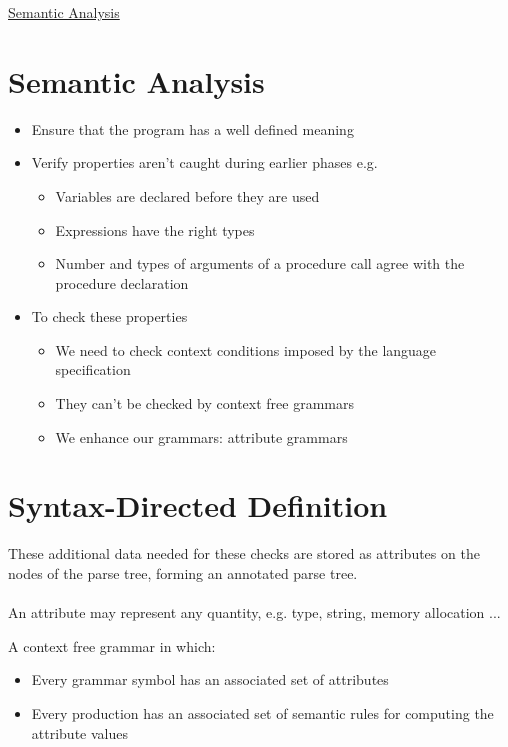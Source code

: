 \documentclass{article}[18pt]
\begin{document}
\begin{center}
\underline{\huge Semantic Analysis}
\end{center}
\section{Semantic Analysis}
\begin{itemize}
	\item Ensure that the program has a well defined meaning
	\item Verify properties aren't caught during earlier phases e.g.
	\begin{itemize}
		\item Variables are declared before they are used
		\item Expressions have the right types
		\item Number and types of arguments of a procedure call agree with the procedure declaration
	\end{itemize}
	\item To check these properties
	\begin{itemize}
		\item We need to check context conditions imposed by the language specification
		\item They can't be checked by context free grammars
		\item We enhance our grammars: attribute grammars
	\end{itemize}
\end{itemize}
\section{Syntax-Directed Definition}
These additional data needed for these checks are stored as attributes on the nodes of the parse tree, forming an annotated parse tree.\\
\\
An attribute may represent any quantity, e.g. type, string, memory allocation ...
\begin{definition}
A context free grammar in which:
\begin{itemize}
	\item Every grammar symbol has an associated set of attributes
	\item Every production has an associated set of semantic rules for computing the attribute values
\end{itemize}
\end{definition}
\end{document}
